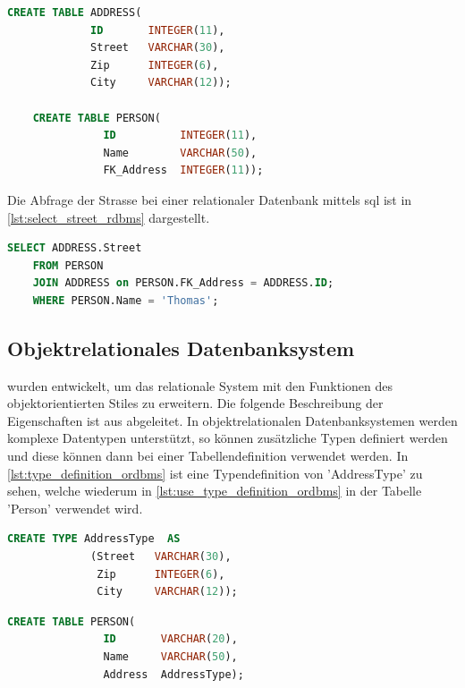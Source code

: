 \begin{lstlisting}[language=SQL, caption=Tabellendefinition in relationalem Datenbanksystem, label=lst:table_definition_rdbms]  
    CREATE TABLE ADDRESS(
             ID       INTEGER(11),
             Street   VARCHAR(30),
             Zip      INTEGER(6),
             City     VARCHAR(12));

    CREATE TABLE PERSON(
               ID          INTEGER(11),
               Name        VARCHAR(50),
               FK_Address  INTEGER(11));
\end{lstlisting}

Die Abfrage der Strasse bei einer relationaler Datenbank mittels \gls{sql} ist in \autoref{lst:select_street_rdbms} dargestellt.

\begin{lstlisting}[language=SQL, caption=Abfrage in relationalem Datenbanksystem, label=lst:select_street_rdbms]  
    SELECT ADDRESS.Street
    FROM PERSON 
    JOIN ADDRESS on PERSON.FK_Address = ADDRESS.ID;
    WHERE PERSON.Name = 'Thomas';
\end{lstlisting}

\subsection{Objektrelationales Datenbanksystem}\label{ordbms}
 wurden entwickelt, um das relationale System mit den Funktionen des objektorientierten Stiles zu erweitern.
Die folgende Beschreibung der Eigenschaften ist aus \cite{limited2010introduction} abgeleitet. In objektrelationalen Datenbanksystemen werden 
komplexe Datentypen unterstützt, so können zusätzliche Typen definiert werden und diese können dann bei einer Tabellendefinition verwendet werden.  
In \autoref{lst:type_definition_ordbms} ist eine Typendefinition von 'AddressType' zu sehen, welche wiederum in \autoref{lst:use_type_definition_ordbms} 
in der Tabelle 'Person' verwendet wird.

\begin{lstlisting}[language=SQL, caption=Typendefinition in objektrelationalem Datenbanksystem, label=lst:type_definition_ordbms]  
    CREATE TYPE AddressType  AS
             (Street   VARCHAR(30),
              Zip      INTEGER(6),
              City     VARCHAR(12));
\end{lstlisting}

\begin{lstlisting}[language=SQL, caption=Verwendung von Typendefinition in objektrelationalem Datenbanksystem, label=lst:use_type_definition_ordbms]  
    CREATE TABLE PERSON(
               ID       VARCHAR(20),
               Name     VARCHAR(50),
               Address  AddressType);
\end{lstlisting}

